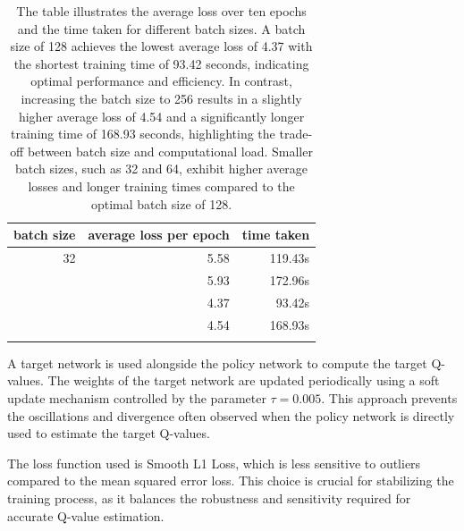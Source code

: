 \documentclass[twocolumn]{webofc}
\begin{document}
\begin{table}[!h]
    \centering
    \begin{tabular}{rrr}
        \toprule
         \textbf{batch size} & \textbf{average loss per epoch} & \textbf{time taken} 
         \\ \midrule
          32 & 5.58  & 119.43s \\ \addlinespace
         64 & 5.93 & 172.96s \\ \addlinespace
        128 & 4.37 & 93.42s \\ \addlinespace
         256 & 4.54 & 168.93s \\ \addlinespace
         \bottomrule
    \end{tabular}
    \caption{The table illustrates the average loss over ten epochs and the time taken for different batch sizes. A batch size of 128 achieves the lowest average loss of 4.37 with the shortest training time of 93.42 seconds, indicating optimal performance and efficiency. In contrast, increasing the batch size to 256 results in a slightly higher average loss of 4.54 and a significantly longer training time of 168.93 seconds, highlighting the trade-off between batch size and computational load. Smaller batch sizes, such as 32 and 64, exhibit higher average losses and longer training times compared to the optimal batch size of 128.}
    \label{tab: batch sizes}
\end{table}




A target network is used alongside the policy network to compute the target Q-values. The weights of the target network are updated periodically using a soft update mechanism controlled by the parameter $\tau = 0.005$. This approach prevents the oscillations and divergence often observed when the policy network is directly used to estimate the target Q-values.

The loss function used is Smooth L1 Loss, which is less sensitive to outliers compared to the mean squared error loss. This choice is crucial for stabilizing the training process, as it balances the robustness and sensitivity required for accurate Q-value estimation.
\end{document}
